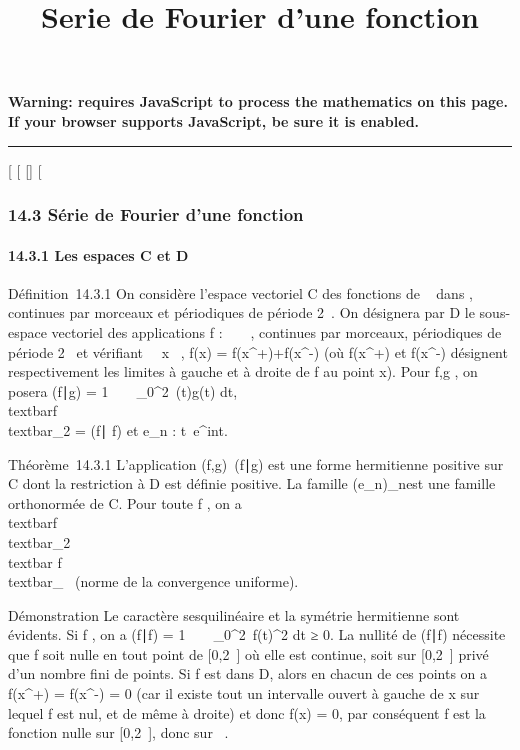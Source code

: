 \documentclass[]{article}
\title{Serie de Fourier d'une fonction}
\author{}
\date{}
\begin{document}
\maketitle

\textbf{Warning: 
requires JavaScript to process the mathematics on this page.\\ If your
browser supports JavaScript, be sure it is enabled.}

\begin{center}\rule{3in}{0.4pt}\end{center}

{[}
{[}
{[}{]}
{[}

\subsubsection{14.3 Série de Fourier d'une fonction}

\paragraph{14.3.1 Les espaces C et D}

Définition~14.3.1 On considère l'espace vectoriel C des fonctions de ~
dans , continues par morceaux et périodiques de période 2\pi~. On
désignera par D le sous-espace vectoriel des applications f : ~ \rightarrow~ ,
continues par morceaux, périodiques de période 2\pi~ et vérifiant
\forall~~x \in {}~, f(x) =
f(x^+)+f(x^-)  (où
f(x^+) et f(x^-) désignent respectivement les
limites à gauche et à droite de f au point x). Pour f,g \inC, on posera
(f∣g) = 1 \pi~
\int ~
\_0^2\pi~\overlinef(t)g(t) dt,
\\textbar{}f\\textbar{}\_2 =
\sqrt(f∣ f) et
e\_n : t\mapsto~e^int.

Théorème~14.3.1 L'application
(f,g)\mapsto~(f\mathrel∣g) est
une forme hermitienne positive sur C dont la restriction à D est définie
positive. La famille (e\_n)\_n est une famille
orthonormée de C. Pour toute f \inC, on a
\\textbar{}f\\textbar{}\_2
\leq\\textbar{} f\\textbar{}\_\infty~
(norme de la convergence uniforme).

Démonstration Le caractère sesquilinéaire et la symétrie hermitienne
sont évidents. Si f \inC, on a (f∣f) = 1
\pi~ \int ~
\_0^2\pi~\textbar{}f(t)\textbar{}^2 dt ≥ 0. La
nullité de (f∣f) nécessite que f soit nulle
en tout point de {[}0,2\pi~{]} où elle est continue, soit sur {[}0,2\pi~{]}
privé d'un nombre fini de points. Si f est dans D, alors en chacun de
ces points on a f(x^+) = f(x^-) = 0 (car il existe
tout un intervalle ouvert à gauche de x sur lequel f est nul, et de même
à droite) et donc f(x) = 0, par conséquent f est la fonction nulle sur
{[}0,2\pi~{]}, donc sur ~.
\end{document}
